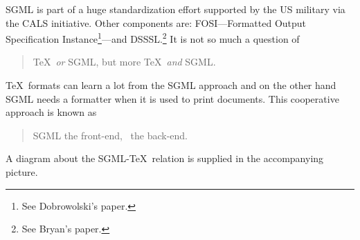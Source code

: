 SGML is part of a huge standardization effort supported by the
US military via the CALS initiative. Other components are: FOSI---Formatted
Output Specification Instance\footnote{See Dobrowolski's paper.}---and
DSSSL.\footnote{See Bryan's paper.}
It is not so much a question of
\begin{quote}\TeX\ {\em or\/} SGML,
but more \TeX\ {\em and\/} SGML.
\end{quote}
\noindent
\TeX\ formats can learn a lot from  the SGML approach and on the other hand
SGML needs a formatter when it is used to  print documents.
This cooperative approach is known as
\begin{quote}
SGML the front-end,
\AllTeX\ the back-end.
\end{quote}
\noindent A diagram about the SGML-\TeX\ relation is
supplied in the accompanying picture.

